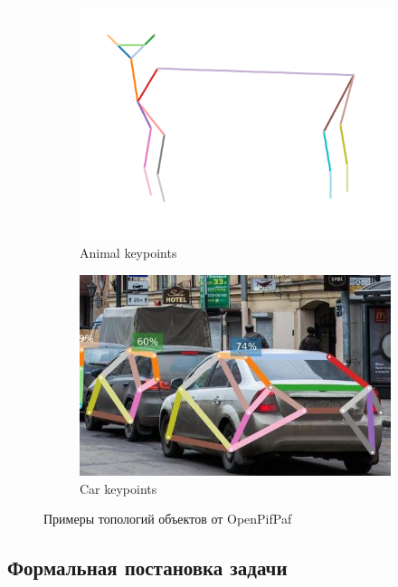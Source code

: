 \begin{figure}[h]
\begin{subfigure}[b]{0.48\textwidth}
	\centering
	\includegraphics[width=\textwidth]{./images/plugins_animalpose.png}
	\caption{Animal keypoints}
\end{subfigure}
\begin{subfigure}[b]{0.48\textwidth}
	\centering
	\includegraphics[width=\textwidth]{./images/car_topology.jpg}
	\caption{Car keypoints}
\end{subfigure}
	\caption{Примеры топологий объектов от OpenPifPaf \cite{OpenPifPaf2021}}
	\label{fig:topology_exaples}
\end{figure}

\subsection{Формальная постановка задачи}
\label{subsec:keypoint_task}

